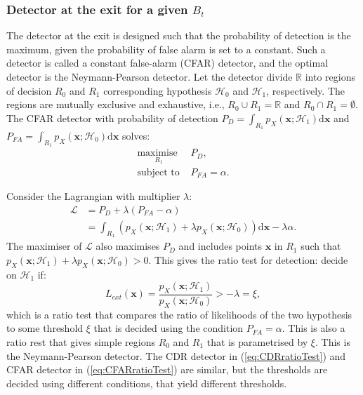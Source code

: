 \documentclass[11pt]{article}
\newcommand{\bx}{\mathbf{x}}
\newcommand{\rr}{\mathbb{R}}
\newcommand{\cH}{\mathcal{H}}
\newcommand{\dd}{\mathrm{d}}
\begin{document}

\subsubsection{Detector at the exit for a given $B_{t}$}
\label{subsubsec:exitDetector}

The detector at the exit is designed such that the probability of detection is the maximum, given the probability of false alarm is set to a constant. Such a detector is called a constant false-alarm (CFAR) detector, and the optimal detector is the Neymann-Pearson detector. Let the detector divide $\rr$ into regions of decision $R_{0}$ and $R_{1}$ corresponding hypothesis $\cH_{0}$ and $\cH_{1}$, respectively. The regions are mutually exclusive and exhaustive, i.e., $R_{0} \cup R_{1} = \rr$ and $R_{0} \cap R_{1} = \emptyset$. The CFAR detector with probability of detection $P_{D} = \int_{R_{1}} p_{X}(\bx;\cH_{1}) \dd\bx$ and $P_{FA} = \int_{R_{1}} p_{X}(\bx;\cH_{0}) \dd\bx$ solves:
\begin{equation}
\begin{split}
	\underset{R_{1}}{\text{maximise }}& P_{D}, \\
	\text{subject to }& P_{FA} = \alpha.
\end{split}
\label{eq:CFARopt}
\end{equation}

Consider the Lagrangian with multiplier $\lambda$:
\begin{equation}
\begin{split}
	\mathcal{L} &= P_{D} + \lambda (P_{FA}-\alpha) \\
	&= \int_{R_{1}} \left( p_{X}(\bx;\cH_{1}) + \lambda p_{X}(\bx;\cH_{0}) \right) \dd\bx - \lambda\alpha.
\end{split}
\label{eq:CFARLag}
\end{equation}
The maximiser of $\mathcal{L}$ also maximises $P_{D}$ and includes points $\bx$ in $R_{1}$ such that $p_{X}(\bx;\cH_{1}) + \lambda p_{X}(\bx;\cH_{0}) > 0$. This gives the ratio test for detection: decide on $\cH_{1}$ if:
\begin{equation}
	L_{ext}(\bx) = \frac{p_{X}(\bx;\cH_{1})}{p_{X}(\bx;\cH_{0})} > -\lambda = \xi,
\label{eq:CFARratioTest}
\end{equation}
which is a ratio test that compares the ratio of likelihoods of the two hypothesis to some threshold $\xi$ that is decided using the condition $P_{FA}=\alpha$. This is also a ratio rest that gives simple regions $R_{0}$ and $R_{1}$ that is parametrised by $\xi$. This is the Neymann-Pearson detector. The CDR detector in (\ref{eq:CDRratioTest}) and CFAR detector in (\ref{eq:CFARratioTest}) are similar, but the thresholds are decided using different conditions, that yield different thresholds.
\end{document}

